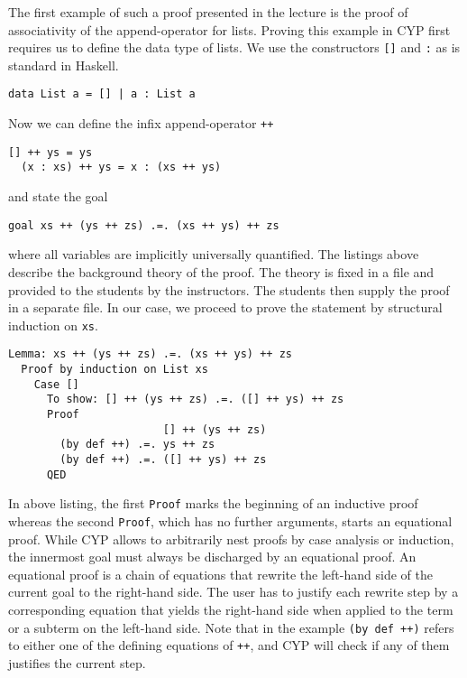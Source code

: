 The first example of such a proof presented in the lecture is the proof of associativity of the append-operator for lists.
Proving this example in CYP first requires us
to define the data type of lists.
We use
the constructors \lstinline[style=cyp]![]! and \lstinline[style=cyp]!:!
as is standard in Haskell.
\begin{lstlisting}[style=cyp]
  data List a = [] | a : List a
\end{lstlisting}
Now we can define the infix append-operator \lstinline[style=cyp]!++!
\begin{lstlisting}[style=cyp]
  [] ++ ys = ys
  (x : xs) ++ ys = x : (xs ++ ys)
\end{lstlisting}
and state the goal
\begin{lstlisting}[style=cyp]
  goal xs ++ (ys ++ zs) .=. (xs ++ ys) ++ zs
\end{lstlisting}
where all variables are implicitly universally quantified.
The listings above describe the background theory of the proof.
The theory is fixed in a file and provided
to the students by the instructors.
The students then supply the proof in a separate file.
In our case, we proceed to prove the statement by structural induction on \lstinline[style=cyp]!xs!.
\begin{lstlisting}[style=cyp]
  Lemma: xs ++ (ys ++ zs) .=. (xs ++ ys) ++ zs
  Proof by induction on List xs
    Case []
      To show: [] ++ (ys ++ zs) .=. ([] ++ ys) ++ zs
      Proof
                        [] ++ (ys ++ zs)
        (by def ++) .=. ys ++ zs
        (by def ++) .=. ([] ++ ys) ++ zs
      QED
\end{lstlisting}
In above listing, the first \lstinline[style=cyp]!Proof! marks the beginning of an inductive proof whereas the second \lstinline[style=cyp]!Proof!, which has no further arguments, starts an equational proof.
While CYP allows to arbitrarily nest proofs
by case analysis or induction,
the innermost goal must always be discharged by an equational proof.
An equational proof is a chain of equations that rewrite the left-hand side of the current goal to the right-hand side.
The user has to justify each rewrite step by a corresponding equation that yields the right-hand side
when applied to the term or a subterm on the left-hand side.
Note that in the example \lstinline[style=cyp]!(by def ++)! refers to either one of the defining equations of \lstinline[style=cyp]!++!,
and CYP will check if any of them justifies the current step.

